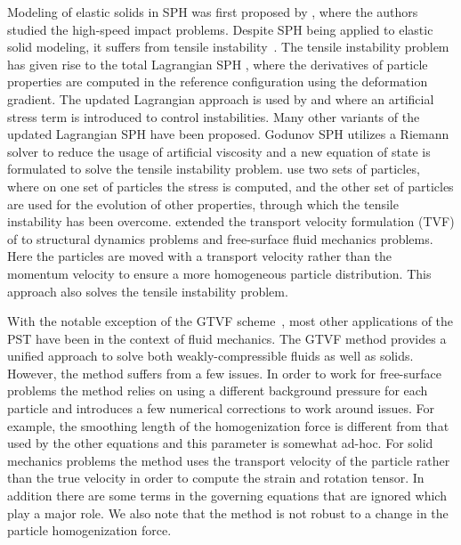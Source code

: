 Modeling of elastic solids in SPH was first proposed by
\cite{libersky1991smooth}, where the authors studied the high-speed impact
problems. Despite SPH being applied to elastic solid modeling, it suffers from
tensile instability~\citep{swegle1995smoothed}. The tensile instability problem
has given rise to the total Lagrangian SPH \citep{belytschko2000unified,
  bonet2002alternative, vignjevic2006sph}, where the derivatives of particle
properties are computed in the reference configuration using the deformation
gradient. The updated Lagrangian approach is used by \cite{gray2001sph} and
\cite{monaghan2000sph} where an artificial stress term is introduced to control
instabilities. Many other variants of the updated Lagrangian SPH have been
proposed. Godunov SPH \citep{sugiura2017extension} utilizes a Riemann solver to
reduce the usage of artificial viscosity and a new equation of state is
formulated to solve the tensile instability problem. \cite{dyka1995approach} use
two sets of particles, where on one set of particles the stress is computed, and
the other set of particles are used for the evolution of other properties,
through which the tensile instability has been overcome.
\cite{zhang2017generalized} extended the transport velocity formulation (TVF) of
\cite{adami2013transport} to structural dynamics problems and free-surface fluid
mechanics problems. Here the particles are moved with a transport velocity
rather than the momentum velocity to ensure a more homogeneous particle
distribution. This approach also solves the tensile instability problem.

With the notable exception of the GTVF scheme~\citep{zhang_hu_adams17}, most
other applications of the PST have been in the context of fluid mechanics. The
GTVF method provides a unified approach to solve both weakly-compressible fluids
as well as solids. However, the method suffers from a few issues. In order to
work for free-surface problems the method relies on using a different background
pressure for each particle and introduces a few numerical corrections to work
around issues. For example, the smoothing length of the homogenization force is
different from that used by the other equations and this parameter is somewhat
ad-hoc. For solid mechanics problems the method uses the transport velocity of
the particle rather than the true velocity in order to compute the strain and
rotation tensor. In addition there are some terms in the governing equations
that are ignored which play a major role. We also note that the method is not
robust to a change in the particle homogenization force.

